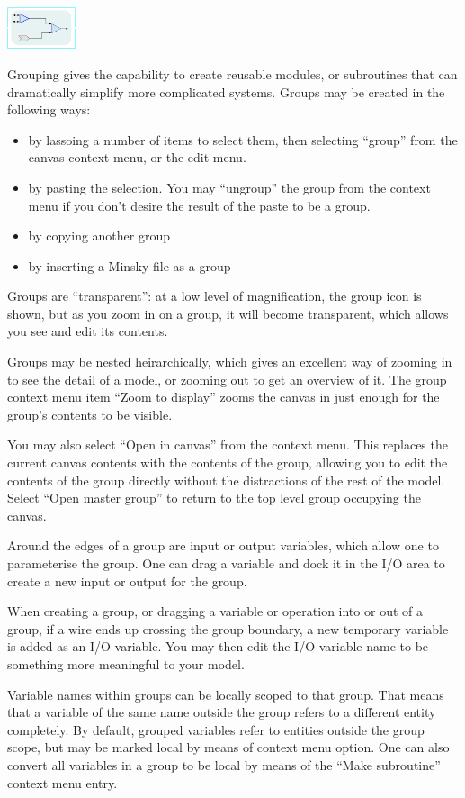 \label{Group}

\includegraphics[width=2cm]{images/group}

Grouping gives the capability to create reusable modules, or subroutines
that can dramatically simplify more complicated systems. Groups may
be created in the following ways: 
\begin{itemize}
\item by lassoing a number of items to select them, then selecting ``group''
from the canvas context menu, or the edit menu. 
\item by pasting the selection. You may ``ungroup'' the group from the
context menu if you don't desire the result of the paste to be a group. 
\item by copying another group 
\item by inserting a Minsky file as a group 
\end{itemize}
Groups are ``transparent'': at a low level of magnification, the
group icon is shown, but as you zoom in on a group, it will become
transparent, which allows you see and edit its contents. 

Groups may be nested heirarchically, which gives an excellent way
of zooming in to see the detail of a model, or zooming out to get
an overview of it. The group context menu item ``Zoom to display''
zooms the canvas in just enough for the group's contents to be visible.

You may also select ``Open in canvas'' from the context menu. This
replaces the current canvas contents with the contents of the group,
allowing you to edit the contents of the group directly without the
distractions of the rest of the model. Select ``Open master group''
to return to the top level group occupying the canvas.

Around the edges of a group are input or output variables, which allow
one to parameterise the group. One can drag a variable and dock it
in the I/O area to create a new input or output for the group.

When creating a group, or dragging a variable or operation into or
out of a group, if a wire ends up crossing the group boundary, a new
temporary variable is added as an I/O variable. You may then edit
the I/O variable name to be something more meaningful to your model.

Variable names within groups can be locally scoped to that group.
That means that a variable of the same name outside the group refers
to a different entity completely. By default, grouped variables refer
to entities outside the group scope, but may be marked local by means
of context menu option. One can also convert all variables in a group
to be local by means of the ``Make subroutine'' context menu entry.

